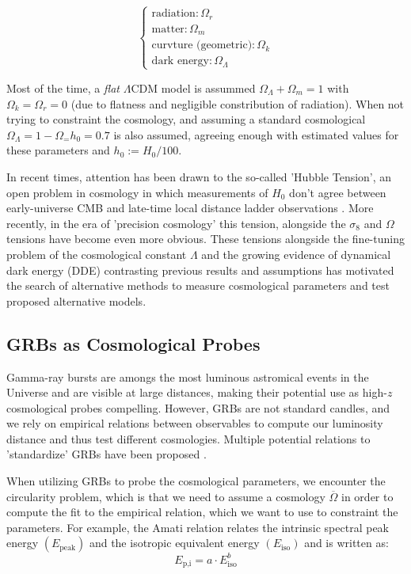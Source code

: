 \documentclass[
    aps,
    prd,
    twocolumn,
    nofootinbib,
    floatfix,
    superscriptaddress,
]{revtex4-2}
\begin{document}
$$
\begin{cases}
	\text{radiation}: \Omega_r \\
	\text{matter}: \Omega_m \\
	\text{curvture (geometric)}: \Omega_k \\
	\text{dark energy}: \Omega_\Lambda
\end{cases}
$$

Most of the time, a \textit{flat} $\Lambda$CDM model is assummed $\Omega_\Lambda + \Omega_m = 1$ with $\Omega_k = \Omega_r = 0$ (due to flatness and negligible constribution of radiation). When not trying to constraint the cosmology, and assuming a standard cosmological $\Omega_\Lambda = 1-\Omega_ = h_0 = 0.7$ is also assumed, agreeing enough with estimated values for these parameters and $h_0 := H_0/100$.

In recent times, attention has been drawn to the so-called 'Hubble Tension', an open problem in cosmology in which measurements of $H_0$ don't agree between early-universe CMB and late-time local distance ladder observations \cite{Di_Valentino_2021, riess2025perfecthostjwstcepheid, Tristram_2024}. More recently, in the era of 'precision cosmology' this tension, alongside the $\sigma_8$ \cite{missing} and $\Omega$ \cite{missing, see rebecca} tensions have become even more obvious. These tensions alongside the fine-tuning problem of the cosmological constant $\Lambda$ \cite{missing} and the growing evidence of dynamical dark energy (DDE) \cite{lodha2025extendeddarkenergyanalysis} contrasting previous results and assumptions has motivated the search of alternative methods to measure cosmological parameters and test proposed alternative models.

\subsection{GRBs as Cosmological Probes}

Gamma-ray bursts are amongs the most luminous astromical events in the Universe and are visible at large distances, making their potential use as high-$z$ cosmological probes compelling. However, GRBs are not standard candles, and we rely on empirical relations between observables to compute our luminosity distance and thus test different cosmologies. Multiple potential relations to 'standardize' GRBs have been proposed \cite{ghirlanda200X}.

When utilizing GRBs to probe the cosmological parameters, we encounter the circularity problem, which is that we need to assume a cosmology $\overline\Omega$ in order to compute the fit to the empirical relation, which we want to use to constraint the parameters. For example, the Amati relation relates the intrinsic spectral peak energy $(E_\text{peak})$ and the isotropic equivalent energy $(E_\text{iso})$ and is written as:
$$
E_\text{p,i} = a \cdot E_\text{iso}^b
$$
\end{document}
